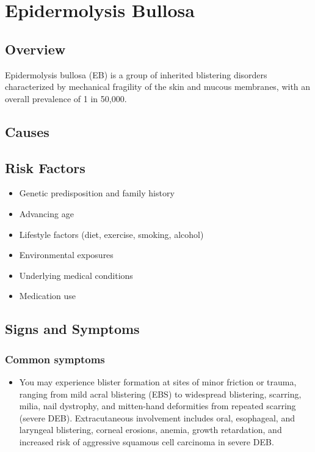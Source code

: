 \chapter{Epidermolysis Bullosa}
\label{sec:Epidermolysis Bullosa}

\section{Overview}
Epidermolysis bullosa (EB) is a group of inherited blistering disorders characterized by mechanical fragility of the skin and mucous membranes, with an overall prevalence of 1 in 50,000.
\section{Causes}
\section{Risk Factors}

\begin{itemize}[noitemsep]
  \item Genetic predisposition and family history
  \item Advancing age
  \item Lifestyle factors (diet, exercise, smoking, alcohol)
  \item Environmental exposures
  \item Underlying medical conditions
  \item Medication use
\end{itemize}
\section{Signs and Symptoms}

\subsection{Common symptoms}
\begin{itemize}[noitemsep]
  \item You may experience blister formation at sites of minor friction or trauma, ranging from mild acral blistering (EBS) to widespread blistering, scarring, milia, nail dystrophy, and mitten-hand deformities from repeated scarring (severe DEB). Extracutaneous involvement includes oral, esophageal, and laryngeal blistering, corneal erosions, anemia, growth retardation, and increased risk of aggressive squamous cell carcinoma in severe DEB. 
  \end{itemize}

